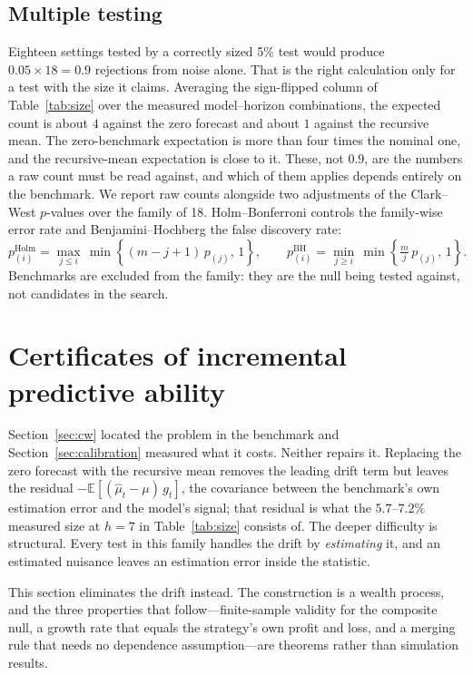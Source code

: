 \documentclass{article}
\theoremstyle{plain}
\theoremstyle{definition}
\begin{document}
\subsection{Multiple testing}

Eighteen settings tested by a correctly sized 5\% test would produce
$0.05 \times 18 = 0.9$ rejections from noise alone. That is the right calculation
only for a test with the size it claims. Averaging the sign-flipped column of
Table~\ref{tab:size} over the measured model--horizon combinations, the expected
count is about $4$ against the zero forecast and about $1$ against the recursive
mean. The zero-benchmark expectation is more than four times the nominal one, and
the recursive-mean expectation is close to it. These, not $0.9$, are the numbers a
raw count must be read against, and which of them applies depends entirely on the
benchmark. We report raw counts alongside two
adjustments of the Clark--West $p$-values over the family of 18. Holm--Bonferroni
\citep{holm1979} controls the family-wise error rate and Benjamini--Hochberg
\citep{benjamini1995} the false discovery rate:
%
\begin{equation}
  p^{\mathrm{Holm}}_{(i)} = \max_{j \le i}\, \min\!\left\{(m - j + 1)\,p_{(j)},\, 1\right\},
  \qquad
  p^{\mathrm{BH}}_{(i)} = \min_{j \ge i}\, \min\!\left\{\tfrac{m}{j}\,p_{(j)},\, 1\right\}.
\end{equation}
%
Benchmarks are excluded from the family: they are the null being tested against,
not candidates in the search.

\section{Certificates of incremental predictive ability}
\label{sec:certificate}

Section~\ref{sec:cw} located the problem in the benchmark and Section~\ref{sec:calibration}
measured what it costs. Neither repairs it. Replacing the zero forecast with the recursive
mean removes the leading drift term but leaves the residual
$-\mathbb{E}[(\hat\mu_t-\mu)\,g_t]$, the covariance between the benchmark's own estimation
error and the model's signal; that residual is what the $5.7$--$7.2\%$ measured size at $h=7$
in Table~\ref{tab:size} consists of. The deeper difficulty is structural. Every test in this
family handles the drift by \emph{estimating} it, and an estimated nuisance leaves an
estimation error inside the statistic.

This section eliminates the drift instead. The construction is a wealth process, and the
three properties that follow---finite-sample validity for the composite null, a growth rate
that equals the strategy's own profit and loss, and a merging rule that needs no dependence
assumption---are theorems rather than simulation results.
\end{document}
